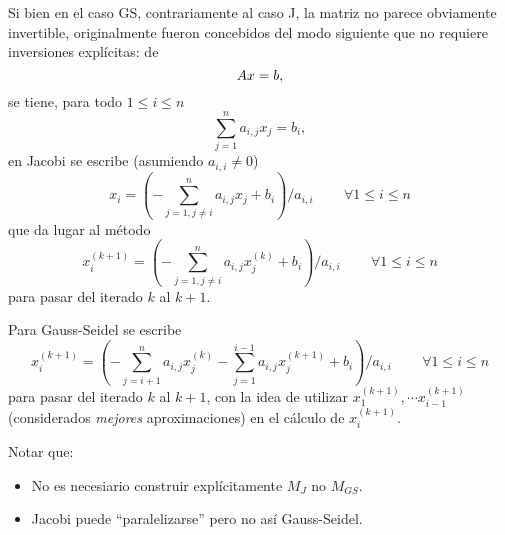 Si bien en el caso GS, contrariamente al  caso J, la matriz no parece obviamente invertible, originalmente fueron concebidos del  modo siguiente que no requiere inversiones explícitas:
de
$$
\Ab\xb=\bb,
$$
se tiene, para todo $1\le i\le n$
$$
\sum_{j=1}^na_{i,j}x_j=b_i,
$$
en Jacobi se escribe (asumiendo $a_{i,i}\neq0$)
$$
x_i=\left(-\sum_{j=1,j\neq i}^na_{i,j}x_j+b_i\right)/a_{i,i}\, \qquad \forall 1\le i\le n
$$
que da lugar al método
$$
x_i^{(k+1)}=\left(-\sum_{j=1,j\neq i}^na_{i,j}x_j^{(k)}+b_i\right)/a_{i,i}\, \qquad \forall 1\le i\le n
$$
para pasar del iterado $k$ al $k+1$.



Para Gauss-Seidel se escribe
$$
x_i^{(k+1)}=\left(-\sum_{j=i+1}^na_{i,j}x_j^{(k
)}-\sum_{j=1}^{i-1}a_{i,j}x_j^{(k+1)}+b_i\right)/a_{i,i}\, \qquad \forall 1\le i\le n
$$
para pasar del iterado $k$ al $k+1$, con la idea de  utilizar
$x_1^{(k+1)},\cdots x_{i-1}^{(k+1)}$ (considerados \emph{mejores} aproximaciones) en el cálculo de $x_i^{(k+1)}$.

Notar que:
\begin{itemize}
\item No es necesiario construir explícitamente $M_J$ no $M_{GS}$.
 \item Jacobi puede ``paralelizarse'' pero no así Gauss-Seidel.
\end{itemize}



